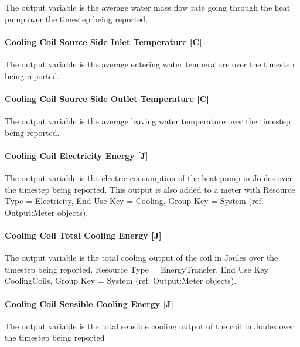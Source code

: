 The output variable is the average water mass flow rate going through the heat pump over the timestep being reported.

\paragraph{Cooling Coil Source Side Inlet Temperature {[}C{]}}\label{cooling-coil-source-side-inlet-temperature-c}

The output variable is the average entering water temperature over the timestep being reported.

\paragraph{Cooling Coil Source Side Outlet Temperature {[}C{]}}\label{cooling-coil-source-side-outlet-temperature-c}

The output variable is the average leaving water temperature over the timestep being reported.

\paragraph{Cooling Coil Electricity Energy {[}J{]}}\label{cooling-coil-electric-energy-j-3}

The output variable is the electric consumption of the heat pump in Joules over the timestep being reported. This output is also added to a meter with Resource Type = Electricity, End Use Key = Cooling, Group Key = System (ref. Output:Meter objects).

\paragraph{Cooling Coil Total Cooling Energy {[}J{]}}\label{cooling-coil-total-cooling-energy-j-8}

The output variable is the total cooling output of the coil in Joules over the timestep being reported. Resource Type = EnergyTransfer, End Use Key = CoolingCoils, Group Key = System (ref. Output:Meter objects).

\paragraph{Cooling Coil Sensible Cooling Energy {[}J{]}}\label{cooling-coil-sensible-cooling-energy-j-8}

The output variable is the total sensible cooling output of the coil in Joules over the timestep being reported

